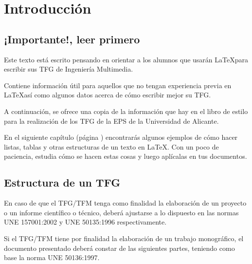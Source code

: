 \chapter{Introducción}
\section{¡Importante!, leer primero}

Este texto está escrito pensando en orientar a los alumnos que usarán \LaTeX para escribir sus TFG de Ingeniería Multimedia.

Contiene información útil para aquellos que no tengan experiencia previa en \LaTeX así como algunos datos acerca de cómo escribir mejor su TFG.

A continuación, se ofrece una copia de la información que hay en el libro de estilo para la realización de los TFG de la EPS de la Universidad de Alicante.

En el siguiente capítulo (página \pageref{marcoteorico}) encontrarás algunos ejemplos de cómo hacer listas, tablas y otras estructuras de un texto en \LaTeX. Con un poco de paciencia, estudia cómo se hacen estas cosas y luego aplícalas en tus documentos.

\section{Estructura de un TFG}

En caso de que el TFG/TFM tenga como finalidad la elaboración de un proyecto o un 
informe científico o técnico, deberá ajustarse a lo dispuesto en las normas UNE 
157001:2002 y UNE 50135:1996 respectivamente.

Si el TFG/TFM tiene por finalidad la elaboración de un trabajo monográfico, el 
documento presentado deberá constar de las siguientes partes, teniendo como base la 
norma UNE 50136:1997.

